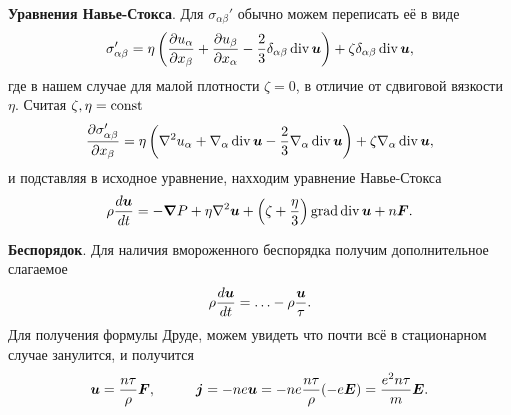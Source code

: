 \textbf{Уравнения Навье-Стокса}. Для $\sigma_{\alpha \beta}'$ обычно можем переписать её в виде
\begin{equation*}
	\sigma_{\alpha \beta}' = \eta \left(
		\frac{\partial u_\alpha}{\partial x_\beta} + \frac{\partial u_\beta}{\partial x_\alpha} - \frac{2}{3} \delta_{\alpha \beta} \mathop{\mathrm{div}}\nolimits \boldsymbol{u}
	\right) + \zeta \delta_{\alpha \beta} \mathop{\mathrm{div}}\nolimits \boldsymbol{u},
\end{equation*}
где в нашем случае для малой плотности $\zeta = 0$, в отличие от сдвиговой вязкости $\eta$. Считая $\zeta, \eta = \textnormal{const}$
\begin{equation*}
	\frac{\partial \sigma_{\alpha \beta}'}{\partial x_\beta}  = \eta\left(
		\nabla^2 u_\alpha + \nabla_\alpha \mathop{\mathrm{div}}\nolimits \boldsymbol{u} - \frac{2}{3} \nabla_\alpha \mathop{\mathrm{div}}\nolimits \boldsymbol{u}
	\right) + \zeta \nabla_\alpha \mathop{\mathrm{div}}\nolimits \boldsymbol{u},
\end{equation*}
и подставляя в исходное уравнение, нахходим уравнение Навье-Стокса
\begin{equation}
	\rho \frac{d \boldsymbol{u}}{d t}  = - \boldsymbol{\nabla} P + \eta \nabla^2 \boldsymbol{u} + \left(
		\zeta + \frac{\eta}{3}
	\right) \mathop{\mathrm{grad}}\nolimits \mathop{\mathrm{div}}\nolimits \boldsymbol{u} + n \boldsymbol{F}.
\end{equation}


\textbf{Беспорядок}. Для наличия вмороженного беспорядка получим дополнительное слагаемое
\begin{equation*}
	\rho \frac{d \boldsymbol{u}}{d t} =\ldots - \rho \frac{\boldsymbol{u}}{\tau}.
\end{equation*}
Для получения формулы Друде, можем увидеть что почти всё в стационарном случае занулится, и получится
\begin{equation*}
	\vc{u} = \frac{n \tau}{\rho } \vc{F},
	\hspace{10 mm}
	\vc{j} = - n e \vc{u} = - n e \frac{n \tau}{\rho} (-e \vc{E}) = \frac{e^2 n \tau}{m} \vc{E}.
\end{equation*}


